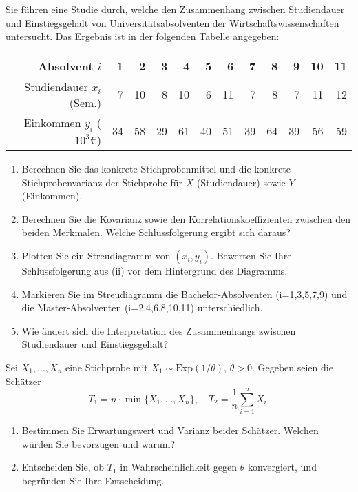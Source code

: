 \begin{aufgabe}
Sie führen eine Studie durch, welche den Zusammenhang zwischen Studiendauer und Einstiegsgehalt von Universitätsabsolventen der Wirtschaftswissenschaften untersucht. Das Ergebnis ist in der folgenden Tabelle angegeben:

\begin{center}
\begin{tabular}{r|*{11}{r}}
Absolvent \(i\)              & 1 & 2 & 3 & 4 & 5 & 6 & 7 & 8 & 9 & 10 & 11 \\ \hline
Studiendauer \(x_i\) (Sem.)  & 7 & 10 & 8 & 10 & 6 & 11 & 7 & 8 & 7 & 11 & 12 \\
Einkommen \(y_i\) (\(10^3€\)) & 34 & 58 & 29 & 61 & 40 & 51 & 39 & 64 & 39 & 56 & 59
\end{tabular}
\end{center}

\begin{enumerate}
  \item Berechnen Sie das konkrete Stichprobenmittel und die konkrete Stichprobenvarianz der Stichprobe für \(X\) (Studiendauer) sowie \(Y\) (Einkommen).
  \item Berechnen Sie die Kovarianz sowie den Korrelationskoeffizienten zwischen den beiden Merkmalen. Welche Schlussfolgerung ergibt sich daraus?
  \item Plotten Sie ein Streudiagramm von \((x_i,y_i)\). Bewerten Sie Ihre Schlussfolgerung aus (ii) vor dem Hintergrund des Diagramms.
  \item Markieren Sie im Streudiagramm die Bachelor‑Absolventen (i=1,3,5,7,9) und die Master‑Absolventen (i=2,4,6,8,10,11) unterschiedlich.
  \item Wie ändert sich die Interpretation des Zusammenhangs zwischen Studiendauer und Einstiegsgehalt?
\end{enumerate}
\end{aufgabe}

\begin{aufgabe}
Sei \(X_1,\dots,X_n\) eine Stichprobe mit \(X_1\sim\mathrm{Exp}(1/\theta)\), \(\theta>0\). Gegeben seien die Schätzer
\[
  T_1 = n\cdot \min\{X_1,\dots,X_n\},
  \quad
  T_2 = \frac{1}{n}\sum_{i=1}^n X_i.
\]
\begin{enumerate}
  \item Bestimmen Sie Erwartungswert und Varianz beider Schätzer. Welchen würden Sie bevorzugen und warum?
  \item Entscheiden Sie, ob \(T_1\) in Wahrscheinlichkeit gegen \(\theta\) konvergiert, und begründen Sie Ihre Entscheidung.
\end{enumerate}
\end{aufgabe}

